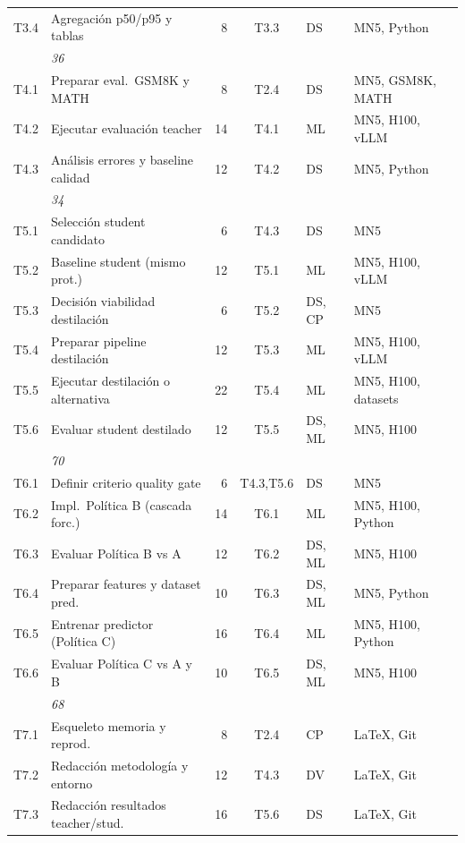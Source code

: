 \documentclass[11pt,a4paper]{article}
\begin{document}
{\begin{tabularx}{\textwidth}{>{\ttfamily}l >{\raggedright\arraybackslash}p{4.5cm} r c >{\raggedright\arraybackslash}p{1.1cm} >{\raggedright\arraybackslash}X}
T3.4 & Agregación p50/p95 y tablas & 8 & T3.3 & DS & MN5, Python \\
\multicolumn{2}{r}{\textit{Subtotal F3}} & \textit{36} & & & \\
\addlinespace[2pt]
T4.1 & Preparar eval.\ GSM8K y MATH & 8 & T2.4 & DS & MN5, GSM8K, MATH \\
T4.2 & Ejecutar evaluación teacher & 14 & T4.1 & ML & MN5, H100, vLLM \\
T4.3 & Análisis errores y baseline calidad & 12 & T4.2 & DS & MN5, Python \\
\multicolumn{2}{r}{\textit{Subtotal F4}} & \textit{34} & & & \\
\addlinespace[2pt]
T5.1 & Selección student candidato & 6 & T4.3 & DS & MN5 \\
T5.2 & Baseline student (mismo prot.) & 12 & T5.1 & ML & MN5, H100, vLLM \\
T5.3 & Decisión viabilidad destilación & 6 & T5.2 & DS, CP & MN5 \\
T5.4 & Preparar pipeline destilación & 12 & T5.3 & ML & MN5, H100, vLLM \\
T5.5 & Ejecutar destilación o alternativa & 22 & T5.4 & ML & MN5, H100, datasets \\
T5.6 & Evaluar student destilado & 12 & T5.5 & DS, ML & MN5, H100 \\
\multicolumn{2}{r}{\textit{Subtotal F5}} & \textit{70} & & & \\
\addlinespace[2pt]
T6.1 & Definir criterio quality gate & 6 & T4.3,T5.6 & DS & MN5 \\
T6.2 & Impl.\ Política B (cascada forc.) & 14 & T6.1 & ML & MN5, H100, Python \\
T6.3 & Evaluar Política B vs A & 12 & T6.2 & DS, ML & MN5, H100 \\
T6.4 & Preparar features y dataset pred. & 10 & T6.3 & DS, ML & MN5, Python \\
T6.5 & Entrenar predictor (Política C) & 16 & T6.4 & ML & MN5, H100, Python \\
T6.6 & Evaluar Política C vs A y B & 10 & T6.5 & DS, ML & MN5, H100 \\
\multicolumn{2}{r}{\textit{Subtotal F6}} & \textit{68} & & & \\
\addlinespace[2pt]
T7.1 & Esqueleto memoria y reprod. & 8 & T2.4 & CP & LaTeX, Git \\
T7.2 & Redacción metodología y entorno & 12 & T4.3 & DV & LaTeX, Git \\
T7.3 & Redacción resultados teacher/stud. & 16 & T5.6 & DS & LaTeX, Git \\

\end{tabularx}}
\end{document}

